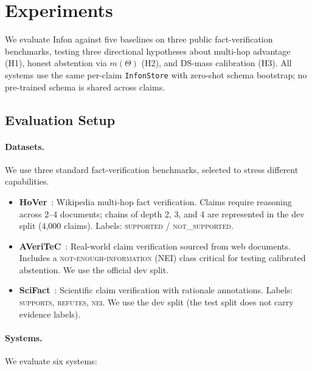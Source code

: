 \section{Experiments}
\label{sec:experiments}

We evaluate Infon against five baselines on three public fact-verification
benchmarks, testing three directional hypotheses about multi-hop advantage
(H1), honest abstention via $m(\Theta)$ (H2), and DS-mass calibration (H3).
All systems use the same per-claim \texttt{InfonStore} with zero-shot schema
bootstrap; no pre-trained schema is shared across claims.

\subsection{Evaluation Setup}
\label{sec:experiments:setup}

\paragraph{Datasets.}
We use three standard fact-verification benchmarks, selected to stress
different capabilities.

\begin{itemize}
  \item \textbf{HoVer}~\cite{jiang2020hover}: Wikipedia multi-hop fact
    verification.  Claims require reasoning across 2--4 documents; chains
    of depth 2, 3, and 4 are represented in the dev split (4,000 claims).
    Labels: \textsc{supported} / \textsc{not\_supported}.

  \item \textbf{AVeriTeC}~\cite{schlichtkrull2023averitec}: Real-world claim
    verification sourced from web documents.  Includes a
    \textsc{not-enough-information} (NEI) class critical for testing
    calibrated abstention.  We use the official dev split.

  \item \textbf{SciFact}~\cite{wadden2020scifact}: Scientific claim
    verification with rationale annotations.  Labels: \textsc{supports},
    \textsc{refutes}, \textsc{nei}.  We use the dev split (the test split
    does not carry evidence labels).
\end{itemize}

\paragraph{Systems.}
We evaluate six systems:

